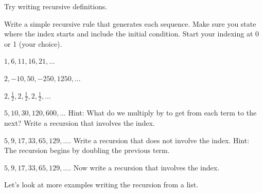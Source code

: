 Try writing recursive definitions.

\begin{act}
\label{act_next_term_rec}
    Write a simple recursive rule that generates each sequence. Make sure you state where the index starts and include the initial condition.  Start your indexing at 0 or 1 (your choice). 
        \begin{actpart}
            \item $1, 6, 11, 16, 21, \ldots$ 
            \item $2, -10, 50, -250, 1250,\ldots$ 
            
            \item $2, \frac{1}{2}, 2, \frac{1}{2}, 2, \frac{1}{2}, \ldots$
            \item $5, 10, 30, 120, 600, \ldots$   Hint: What do we multiply by to get from each term to the next?  Write a recursion that involves the index.
            \item $5, 9, 17, 33, 65, 129, \ldots$. Write a recursion that does not involve the index. Hint: The recursion begins by doubling the previous term.
            \item $5, 9, 17, 33, 65, 129, \ldots$. Now write a recursion that involves the index. 
        \end{actpart}
\end{act}

Let's look at more examples writing the recursion from a list.

